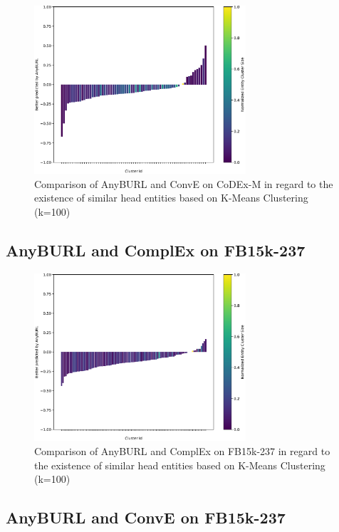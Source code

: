 \begin{figure}[H]
\centering
\includegraphics[width=0.7\textwidth]{images/head_cluster_100_anyburl_rescal_codex.PNG}
\caption{Comparison of AnyBURL and ConvE on CoDEx-M in regard to the existence of similar head entities based on K-Means Clustering (k=100)}
\label{fig:head_cluster_100_anyburl_rescal_codex}
\end{figure}

\subsection{AnyBURL and ComplEx on FB15k-237}

\begin{figure}[H]
\centering
\includegraphics[width=0.7\textwidth]{images/head_cluster_100_anyburl_complex_fb15k.PNG}
\caption{Comparison of AnyBURL and ComplEx on FB15k-237 in regard to the existence of similar head entities based on K-Means Clustering (k=100)}
\label{fig:head_cluster_100_anyburl_complex_fb15k}
\end{figure}

\subsection{AnyBURL and ConvE on FB15k-237}

